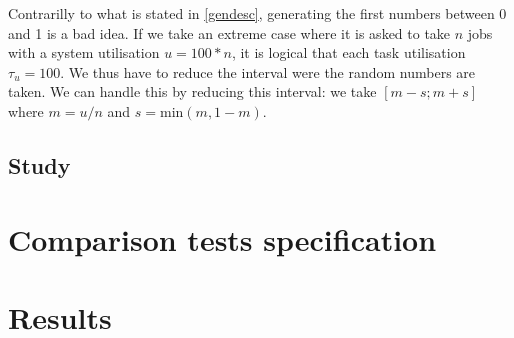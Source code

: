 \documentclass{scrartcl}
\begin{document}
Contrarilly to what is stated in \ref{gendesc}, generating the first numbers between 0 and 1 is a bad idea.
If we take an extreme case where it is asked to take $n$ jobs with a system utilisation $u = 100 * n$, it is logical that each task utilisation $\tau_u = 100$.
We thus have to reduce the interval were the random numbers are taken.
We can handle this by reducing this interval: we take $[m - s; m + s]$ where $m = u / n$ and $s = \text{min}(m, 1-m)$.


\subsection{Study}

\section{Comparison tests specification}

\section{Results}
\end{document}
